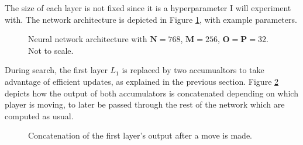 The size of each layer is not fixed since it is a hyperparameter I will experiment with. The network architecture is depicted in Figure \ref{fig:network}, with example parameters.

\begin{figure}[H]
\centering
{}
\caption{Neural network architecture with $\bm{N}=768$, $\bm{M}=256$, $\bm{O}=\bm{P}=32$. Not to scale.}
\label{fig:network}
\end{figure}

During search, the first layer $L_1$ is replaced by two accumualtors to take advantage of efficient updates, as explained in the previous section. Figure \ref{fig:incr_update} depicts how the output of both accumulators is concatenated depending on which player is moving, to later be passed through the rest of the network which are computed as usual. 

\begin{figure}[H]
\centering
{}
\caption{Concatenation of the first layer's output after a move is made.}
\label{fig:incr_update}
\end{figure}

